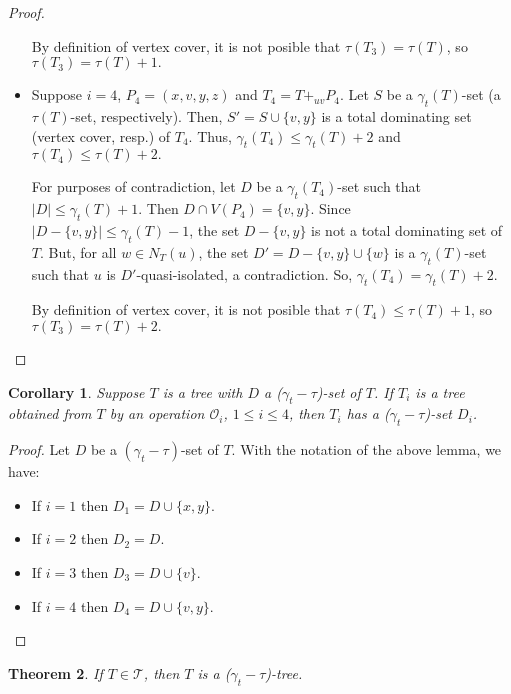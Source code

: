 \documentclass[12pt]{article}%
\newtheorem{theorem}{Theorem}
\newtheorem{corollary}[theorem]{Corollary}
\theoremstyle{definition}
\newcommand{\gtt}{$(\gamma_t - \tau)$}
\begin{document}
\begin{proof}
\begin{itemize}
	By definition of vertex cover, it is not posible that $\tau
	(T_3)=\tau(T)$, so $\tau (T_3)=\tau(T) + 1.$

\item Suppose $i=4$, $P_4 = (x, v, y, z)$ and $T_4 = T +_{uv}
	P_4.$ Let $S$ be a $\gamma_t(T)$-set (a $\tau (T)$-set,
	respectively). Then, $S' = S \cup \{ v,y\}$  is a total
	dominating set (vertex cover, resp.) of $T_4$.   Thus,
	$\gamma_t (T_4) \le \gamma_t (T) + 2$ and  $\tau (T_4)
	\le \tau(T) + 2.$  

	For purposes of contradiction, let $D$ be a $\gamma_t
	(T_4)$-set such that $|D| \le \gamma_t (T) + 1.$ Then $D
	\cap V(P_4)=\{v,y\}$. Since $|D-\{ v,y\}|\leq \gamma_t (T) -
	1$, the set $D-\{ v,y\}$ is not a total dominating set of $T.$
	But, for all $w \in N_T(u)$, the set $D' = D - \{ v, y \} \cup \{
	w \}$ is a $\gamma _t (T)$-set such that $u$ is
	$D'$-quasi-isolated, a contradiction. So, $\gamma_t (T_4)
	=\gamma_t (T) + 2$.
 
	By definition of vertex cover, it is not posible that $\tau (T_4)
	\le \tau(T) + 1$, so $\tau (T_3) = \tau(T) + 2.$ 
\end{itemize}
\end{proof}


\begin{corollary} \label{opgttset}
Suppose $T$ is a tree with  $D$ a ($\gamma _t-\tau $)-set of $T$. If
$T_i$ is a tree obtained from $T$ by an operation $\mathcal{O}_i$,
$1 \le i \le 4$,  then $T_i$ has a ($\gamma _t-\tau $)-set $D_i$. 
\end{corollary}


\begin{proof} Let $D$ be a \gtt-set of $T$. With the
notation of the above lemma, we have:

\begin{itemize}
\item If $i=1$ then $D_1=D\cup \{x,y\}$.
\item If $i=2$ then $D_2=D$.
\item If $i=3$ then $D_3=D\cup \{ v\}$.
\item If $i=4$ then $D_4=D\cup \{ v,y\}$.
\end{itemize}
\end{proof}



\begin{theorem}
If $T \in \mathcal{T}$, then $T$ is a ($\gamma_t-\tau$)-tree.  
\end{theorem}
\end{document}
